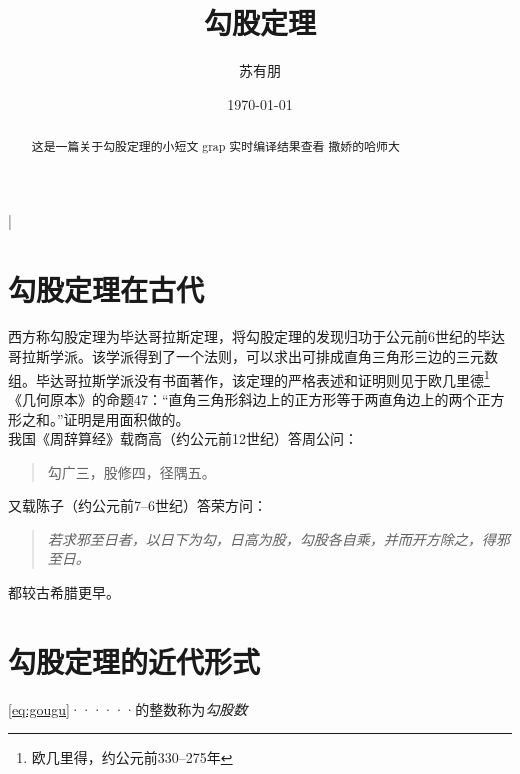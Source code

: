 \documentclass[12pt]{ctexart}
\title{勾股定理}
\author{\kaishu \zihao{3} 苏有朋}
\date{\today}
\newenvironment{myquote}{\begin{quote}\kaishu\zihao{4}}{\end{quote}}
\begin{document}
	\maketitle
	\begin{abstract}
		这是一篇关于勾股定理的小短文
		grap
		实时编译结果查看
		撒娇的哈师大
	\end{abstract}
	\newpage
	\bar{} 
	\tableofcontents
	\newpage

	\section{勾股定理在古代}
	西方称勾股定理为毕达哥拉斯定理，将勾股定理的发现归功于公元前6世纪的毕达哥拉斯学派\cite{Kline}。该学派得到了一个法则，可以求出可排成直角三角形三边的三元数组。毕达哥拉斯学派没有书面著作，该定理的严格表述和证明则见于欧几里德\footnote{欧几里得，约公元前330--275年}《几何原本》的命题47：“直角三角形斜边上的正方形等于两直角边上的两个正方形之和。”证明是用面积做的。\\
	
	我国《周辞算经》载商高（约公元前12世纪）答周公问：
	\begin{myquote}
		勾广三，股修四，径隅五。
	\end{myquote}%

	又载陈子（约公元前7--6世纪）答荣方问：\cite{quanjing}
	\begin{quote}
		\emph{若求邪至日者，以日下为勾，日高为股，勾股各自乘，并而开方除之，得邪至日。}
	\end{quote}
	都较古希腊更早。
	\newpage
	\section{勾股定理的近代形式}
	\eqref{eq:gougu}······的整数称为\emph{勾股数}\\%
	
\end{document}
